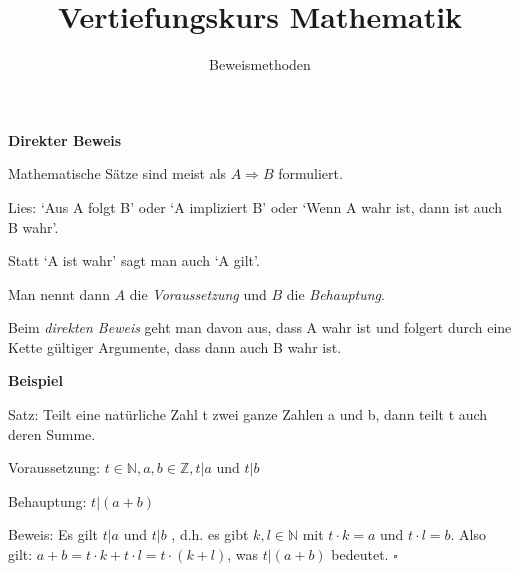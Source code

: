 \usepackage[ngerman]{babel}
\usepackage[utf8]{inputenc}
\usepackage{amsmath}
\usepackage{amssymb}
\usepackage{listings} 
\usepackage{stmaryrd}
\lstset{language=Python, tabsize=4, showstringspaces=false,basicstyle=\footnotesize,mathescape=true} 
\usepackage{mathtools}
\usepackage{ulem}
\usepackage{tikz}

\parskip 10pt




\title{Vertiefungskurs Mathematik}   
\author{Beweismethoden} 
\date{}
\frame{\titlepage} 

\begin{frame}[fragile]

\textbf{Direkter Beweis}

Mathematische Sätze sind meist als $A \Rightarrow B$ formuliert.  

Lies: 
`Aus A folgt B' oder 
 `A impliziert B' oder `Wenn A wahr ist, dann ist auch B wahr'. 
 
 Statt  `A ist wahr' sagt man auch `A gilt'. \pause

Man nennt dann $A$ die \textit{Voraussetzung} und $B$ die \textit{Behauptung}. \pause

Beim \textit{direkten Beweis} geht man davon aus, dass A wahr ist und folgert durch eine
Kette gültiger Argumente, dass dann auch B wahr ist.
\end{frame}


\begin{frame}[fragile]

\textbf{Beispiel}
 
Satz: Teilt eine natürliche Zahl t zwei ganze Zahlen a und b, dann teilt t auch deren Summe.

Voraussetzung: \pause $t \in \mathbb{N}, a, b \in \mathbb{Z}, t|a \text{ und } t|b$ \pause

Behauptung: \pause $t|(a+b)$

Beweis: \pause Es gilt $t|a$ und $t|b$ \pause, d.h. es gibt $k,l \in \mathbb{N}$ mit $t \cdot k = a$ und $t \cdot l = b.$ \pause
Also gilt: $a + b = t \cdot k + t \cdot l =  t \cdot (k + l)$\pause, was $t | (a +b)$ bedeutet. \pause \hfill $\square$

\end{frame}


